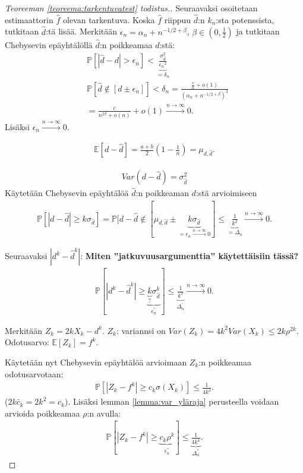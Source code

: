 \documentclass[finnish,12pt,a4paper,pdftex,sci,utf8]{aaltothesis}
\begin{document}
\begin{proof}[Teoreeman \ref{teoreema:tarkentuvatest} todistus.]
	Seuraavaksi osoitetaan estimaattorin $\hat{f}$ olevan tarkentuva. Koska $\hat{f}$ riippuu $\hat{d}$:n $k_n$:sta potenssista, tutkitaan $\hat{d}$:tä lisää. Merkitään $\epsilon_{n}^{} = \alpha_n + n^{-1/2 + \beta} $, $\beta \in (0,\frac{1}{2})$ ja tutkitaan Chebysevin epäyhtälöllä $\hat{d}$:n poikkeamaa $d$:stä:
	\begin{align*}
		&\mathbb{P}[|\hat{d} - d| > \epsilon_{n}^{}] < \underbrace{\frac{\sigma_{\hat{d}}^2}{{\epsilon_{n}^{}}^2}}_{ = \delta_n} \\
		&\mathbb{P}[\hat{d} \notin [d \pm  \epsilon_{n}^{}]] < \delta_n = \frac{\frac{c}{n} + o(1)}{(\alpha_n + n^{-1/2 + \beta})^2} \\
		&= \frac{c}{{n^{2 \beta}} +  o(n)} + o(1) \xrightarrow{n \rightarrow \infty} 0.
	\end{align*}
	Lisäksi $\epsilon_{n}^{} \xrightarrow{n \rightarrow \infty} 0$.

	\begin{align*}
		\mathbb{E}[d - \hat{d}] = \frac{a+b}{2}(1-\frac{1}{n}) = \mu_{d,\hat{d}}.
	\end{align*}
	
	\begin{align*}
		Var(d- \hat{d}) = \sigma_{\hat{d}}^2
	\end{align*}
	Käytetään Chebysevin epäyhtälöä $\hat{d}$:n poikkeaman $d$:stä arvioimiseen
	\begin{align*}
		\mathbb{P}[|d-\hat{d}| \geq k \sigma_{\hat{d}}] = \mathbb{P}[d-\hat{d} \notin [ \mu_{d,\hat{d}} \pm  \underbrace{k \sigma_{\hat{d}}}_{= \epsilon_n \xrightarrow{n \rightarrow \infty } 0}] \leq \underbrace{\frac{1}{k^2}}_{= \Delta_n} \xrightarrow{n \rightarrow \infty } 0.
	\end{align*}

	Seuraavaksi $|d^k - \hat{d}^k|$: \textbf{Miten ''jatkuvuusargumenttia'' käytettäisiin tässä?}
	\begin{align*}
		\mathbb{P}[|d^k - \hat{d}^k| \geq \underbrace{\underbrace{k}_{?} \sigma_{\hat{d}}^k}_{\epsilon_n^{'}}] \leq \underbrace{\frac{1}{k^2}}_{\Delta_n^{'}} \xrightarrow{n \rightarrow \infty } 0.
	\end{align*}

	Merkitään $Z_k = 2kX_k - d^k$. $Z_k$: variannsi on $Var(Z_k) = 4k^2 Var(X_k) \leq 2k \rho^{2k}$.
	Odotusarvo: $\mathbb{E}[Z_k] = f^k$.

	Käytetään nyt Chebysevin epäyhtälöä arvioimaan $Z_k$:n poikkeamaa odotusarvotaan:
	\begin{align*}
		\mathbb{P}[|Z_k - f^k| \geq c_k \sigma(X_k)] \leq \frac{1}{4k^4}.
	\end{align*}
	($2k \tilde{c_k}  = 2k^2 = c_k$). Lisäksi lemman \ref{lemma:var_yläraja} perusteella voidaan arvioida poikkeamaa $\rho$:n avulla:
	\begin{align*}
		\mathbb{P}[|Z_k - f^k| \geq \underbrace{c_k \rho^k}_{\epsilon_n^{''}}] \leq \underbrace{\frac{1}{4k^4}}_{\Delta_n^{''}}.
	\end{align*}


\end{proof}
\end{document}
